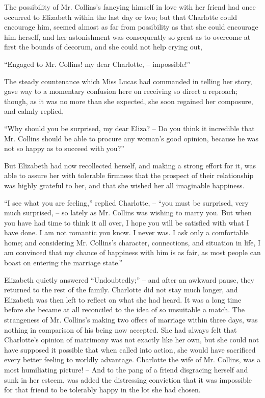 The possibility of Mr. Collins’s fancying himself in love
with her friend had once occurred to Elizabeth within the
last day or two; but that Charlotte could encourage him,
seemed almost as far from possibility as that she could
encourage him herself, and her astonishment was consequently
so great as to overcome at first the bounds of
decorum, and she could not help crying out,

“Engaged to Mr. Collins! my dear Charlotte, --
impossible!”

The steady countenance which Miss Lucas had commanded
in telling her story, gave way to a momentary
confusion here on receiving so direct a reproach; though,
as it was no more than she expected, she soon regained her
composure, and calmly replied,

“Why should you be surprised, my dear Eliza? -- Do
you think it incredible that Mr. Collins should be able to
procure any woman’s good opinion, because he was not so
happy as to succeed with you?”

But Elizabeth had now recollected herself, and making a
strong effort for it, was able to assure her with tolerable
firmness that the prospect of their relationship was highly grateful
to her, and that she wished her all imaginable happiness.

“I see what you are feeling,” replied Charlotte, -- “you
must be surprised, very much surprised, -- so lately as
Mr. Collins was wishing to marry you. But when you
have had time to think it all over, I hope you will be
satisfied with what I have done. I am not romantic you
know. I never was. I ask only a comfortable home;
and considering Mr. Collins’s character, connections, and
situation in life, I am convinced that my chance of happiness
with him is as fair, as most people can boast on
entering the marriage state.”

Elizabeth quietly answered “Undoubtedly;” -- and
after an awkward pause, they returned to the rest of the
family. Charlotte did not stay much longer, and Elizabeth
was then left to reflect on what she had heard. It was
a long time before she became at all reconciled to the idea
of so unsuitable a match. The strangeness of Mr. Collins’s
making two offers of marriage within three days, was
nothing in comparison of his being now accepted. She
had always felt that Charlotte’s opinion of matrimony
was not exactly like her own, but she could not have
supposed it possible that when called into action, she
would have sacrificed every better feeling to worldly
advantage. Charlotte the wife of Mr. Collins, was a most
humiliating picture! -- And to the pang of a friend disgracing
herself and sunk in her esteem, was added the
distressing conviction that it was impossible for that
friend to be tolerably happy in the lot she had chosen.

